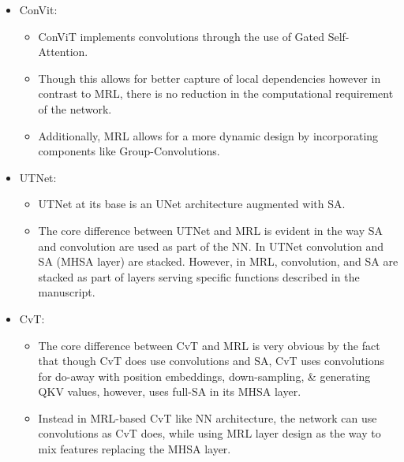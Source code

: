 \documentclass{article}
\begin{document}
\begin{itemize}
    \item ConVit\cite{convit}:
    \begin{itemize}
        \item ConViT implements convolutions through the use of Gated Self-Attention.
        \item Though this allows for better capture of local dependencies however in contrast to MRL, there is no reduction in the computational requirement of the network.
        \item Additionally, MRL allows for a more dynamic design by incorporating components like Group-Convolutions.
    \end{itemize}

    \item UTNet\cite{UTNet}:
    \begin{itemize}
        \item UTNet at its base is an UNet architecture augmented with SA.
        \item The core difference between UTNet and MRL is evident in the way SA and convolution are used as part of the NN. In UTNet convolution and SA (MHSA layer) are stacked. However, in MRL, convolution, and SA are stacked as part of layers serving specific functions described in the manuscript.
    \end{itemize}
    
    \item CvT\cite{DBLP:journals/corr/CvT}:
    \begin{itemize}
        \item The core difference between CvT and MRL is very obvious by the fact that though CvT does use convolutions and SA, CvT uses convolutions for do-away with position embeddings, down-sampling, \& generating QKV values, however, uses full-SA in its MHSA layer.
        \item Instead in MRL-based CvT like NN architecture, the network can use convolutions as CvT does, while using MRL layer design as the way to mix features replacing the MHSA layer.
    \end{itemize}
    

\end{itemize}
\end{document}
